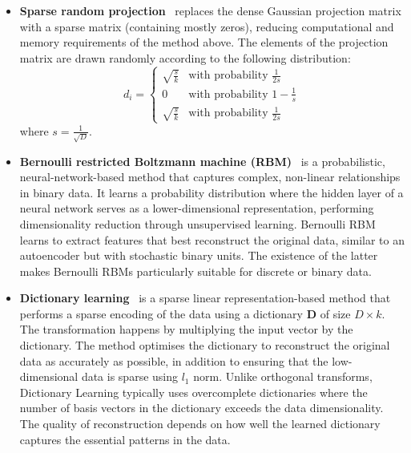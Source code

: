 \begin{itemize}
    which states that a set of points in a high-dimensional space can be embedded into a space of much lower dimensionality such that pairwise distances are preserved with high probability. 


    \item \textbf{Sparse random projection}~\citep{Achlioptas01} replaces the dense Gaussian projection matrix with a sparse matrix (containing mostly zeros), reducing computational and memory requirements of the method above. The elements of the projection matrix are drawn randomly according to the following distribution:
    \begin{equation*}
        d_i= \begin{cases}
            \sqrt{\frac{s}{k}} & \text{with probability } \frac{1}{2s}\\
            0           & \text{with probability } 1 - \frac{1}{s}\\
            \sqrt{\frac{s}{k}} & \text{with probability } \frac{1}{2s}
        \end{cases}
    \end{equation*}
    where $s=\frac{1}{\sqrt{D}}$. 
    \item \textbf{Bernoulli restricted Boltzmann machine (RBM)}~\citep{HinEtAl06} is a probabilistic, neural-network-based method that captures complex, non-linear relationships in binary data. It learns a probability distribution where the hidden layer of a neural network serves as a lower-dimensional representation, performing dimensionality reduction through unsupervised learning. Bernoulli RBM learns to extract features that best reconstruct the original data, similar to an autoencoder but with stochastic binary units. The existence of the latter  makes Bernoulli RBMs particularly suitable for discrete or binary data.
    \item \textbf{Dictionary learning}~\citep{MaiEtAl09} is a sparse linear representation-based method that performs a sparse encoding of the data using a dictionary $\mathbf{D}$ of size $D\times k$. The transformation happens by multiplying the input vector by the dictionary. The method optimises the dictionary to reconstruct the original data as accurately as possible, in addition to ensuring that the low-dimensional data is sparse using $l_1$ norm. Unlike orthogonal transforms, Dictionary Learning typically uses overcomplete dictionaries where the number of basis vectors in the dictionary exceeds the data dimensionality. The quality of reconstruction depends on how well the learned dictionary captures the essential patterns in the data.

\end{itemize}
